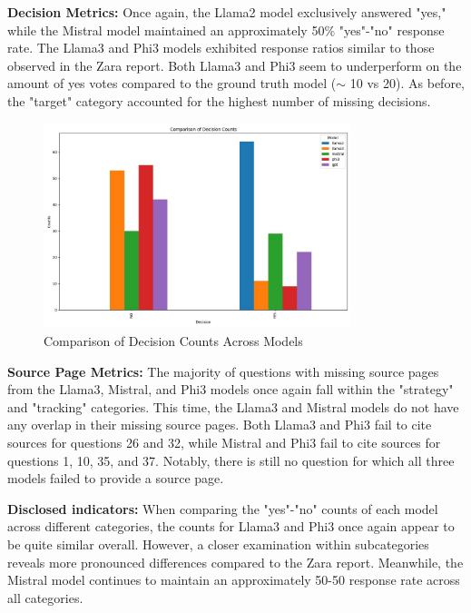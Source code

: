 \documentclass[]{article}
\begin{document}
\textbf{Decision Metrics:}
Once again, the Llama2 model exclusively answered "yes," 
while the Mistral model maintained an approximately 50\% "yes"-"no" response rate. 
The Llama3 and Phi3 models exhibited response ratios similar to those observed in the Zara report.
Both Llama3 and Phi3 seem to underperform on the amount of yes votes compared to the ground truth model ($\sim$ 10 vs 20).
As before, the "target" category accounted for the highest number of missing decisions.

\begin{figure}[H]
    \centering
    \includegraphics[width=0.8\textwidth]{./images/hm_comparison_decision.jpg}
    \caption{Comparison of Decision Counts Across Models}
    \label{fig:image_label}
\end{figure}

\textbf{Source Page Metrics:} The majority of questions with missing source pages from the Llama3, Mistral, 
and Phi3 models once again fall within the "strategy" and 
"tracking" categories. This time, the Llama3 and Mistral models do not have any overlap in their 
missing source pages. Both Llama3 and Phi3 fail to cite sources for questions 26 and 32, 
while Mistral and Phi3 fail to cite sources for questions 1, 10, 35, and 37. 
Notably, there is still no question for which all three models failed to provide a source page.
\newline\newline

\textbf{Disclosed indicators:} When comparing the "yes"-"no" counts of each model across different categories, 
the counts for Llama3 and Phi3 once again appear to be quite similar overall. However, 
a closer examination within subcategories reveals more pronounced differences compared to the Zara report. 
Meanwhile, the Mistral model continues to maintain an approximately 50-50 response rate across all categories.
\newline\newline
\end{document}
